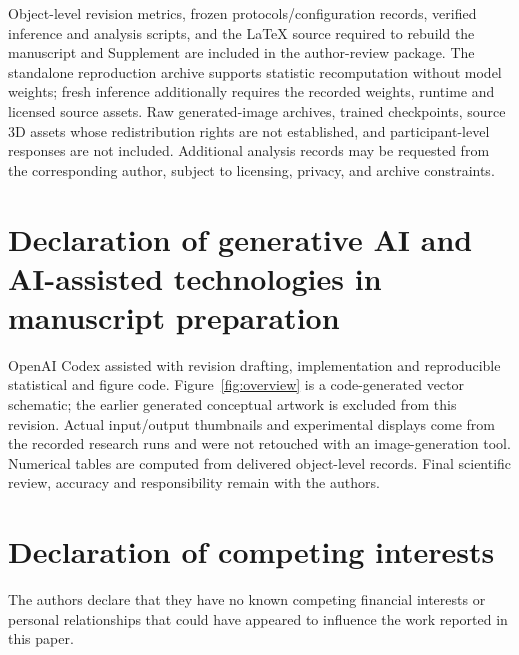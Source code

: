 \documentclass[times,twocolumn,final]{elsarticle}
\providecommand{\DIFadd}[1]{{\protect\color{blue} \sf #1}} %
\providecommand{\DIFaddbegin}{} %
\providecommand{\DIFaddend}{} %
\begin{document}
  \DIFaddbegin \DIFadd{Object-level revision metrics, frozen protocols/configuration records, verified inference and analysis scripts, and the LaTeX source required to rebuild the manuscript and Supplement are included in the author-review package. The standalone reproduction archive supports statistic recomputation without model weights; fresh inference additionally requires the recorded weights, runtime and licensed source assets. Raw generated-image archives, trained checkpoints, source 3D assets whose redistribution rights are not established, and participant-level responses are not included. Additional analysis records may be requested from the corresponding author, subject to licensing, privacy, and archive constraints.
}

\section*{\DIFadd{Declaration of generative AI and AI-assisted technologies in manuscript preparation}}
\DIFadd{OpenAI Codex assisted with revision drafting, implementation and reproducible statistical and figure code. Figure~\ref{fig:overview} is a code-generated vector schematic; the earlier generated conceptual artwork is excluded from this revision. Actual input/output thumbnails and experimental displays come from the recorded research runs and were not retouched with an image-generation tool. Numerical tables are computed from delivered object-level records. Final scientific review, accuracy and responsibility remain with the authors}\DIFaddend .

\section*{Declaration of competing interests}

The authors declare that they have no known competing financial interests or personal relationships that could have appeared to influence the work reported in this paper.
\end{document}
